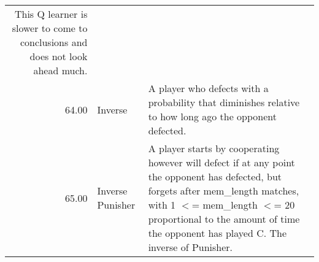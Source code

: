 \begin{tabular}{rll}
	This Q learner is slower to come to conclusions and does not look ahead much.                                                                                                                                                                                                                                                                                                                                                                                                                                                                                                                                                                                                                                                                                                                                                                                                                                                             \\
	64.00  & Inverse                     & A player who defects with a probability that diminishes relative to how
	long ago the opponent defected.                                                                                                                                                                                                                                                                                                                                                                                                                                                                                                                                                                                                                                                                                                                                                                                                                                                                                                              \\
	65.00  & Inverse Punisher            & A player starts by cooperating however will defect if at any point the
	opponent has defected, but forgets after mem\_length matches, with
	1 \ensuremath{<}= mem\_length \ensuremath{<}= 20 proportional to the amount of time the opponent
	has played C. The inverse of Punisher.                                                                                                                                                                                                                                                                                                                                                                                                                                                                                                                                                                                                                                                                                                                                                        \\

\end{tabular}
